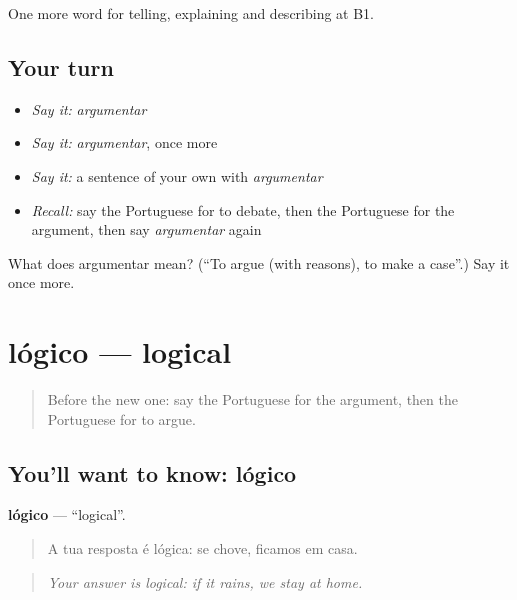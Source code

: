 \begin{grammarlens}[title={What you've built}]
One more word for telling, explaining and describing at B1.
\end{grammarlens}

\subsection*{Your turn}
\begin{itemize}
\raggedright
  \item \emph{Say it:} \emph{argumentar}
  \item \emph{Say it:} \emph{argumentar}, once more
  \item \emph{Say it:} a sentence of your own with \emph{argumentar}
  \item \emph{Recall:} say the Portuguese for to debate, then the Portuguese for the argument, then say \emph{argumentar} again
\end{itemize}

\begin{tcolorbox}[breakable,colback=teal!4,colframe=teal!35!black,title={Before you move on}]
What does argumentar mean? (\textquotedblleft{}To argue (with reasons), to make a case\textquotedblright{}.) Say it once more.
\end{tcolorbox}
\section[lógico]{lógico — logical}

\label{lesson:PT-C337-logico}



\begin{quote}
Before the new one: say the Portuguese for the argument, then the Portuguese for to argue.
\end{quote}

\subsection*{You'll want to know: lógico}
\textbf{lógico} — \textquotedblleft{}logical\textquotedblright{}.

\begin{quote}
A tua resposta é lógica: se chove, ficamos em casa.
\end{quote}

\begin{quote}
\emph{Your answer is logical: if it rains, we stay at home.}
\end{quote}

